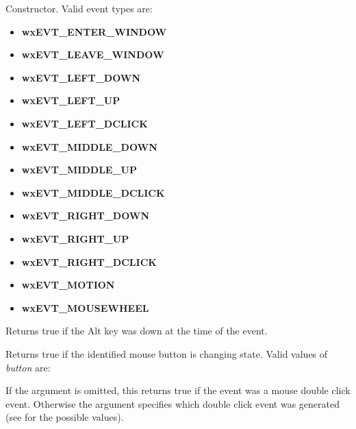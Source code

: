 Constructor. Valid event types are:

\begin{itemize}
\itemsep=0pt
\item {\bf wxEVT\_ENTER\_WINDOW}
\item {\bf wxEVT\_LEAVE\_WINDOW}
\item {\bf wxEVT\_LEFT\_DOWN}
\item {\bf wxEVT\_LEFT\_UP}
\item {\bf wxEVT\_LEFT\_DCLICK}
\item {\bf wxEVT\_MIDDLE\_DOWN}
\item {\bf wxEVT\_MIDDLE\_UP}
\item {\bf wxEVT\_MIDDLE\_DCLICK}
\item {\bf wxEVT\_RIGHT\_DOWN}
\item {\bf wxEVT\_RIGHT\_UP}
\item {\bf wxEVT\_RIGHT\_DCLICK}
\item {\bf wxEVT\_MOTION}
\item {\bf wxEVT\_MOUSEWHEEL}
\end{itemize}


\label{wxmouseeventaltdown}


Returns true if the Alt key was down at the time of the event.


\label{wxmouseeventbutton}


Returns true if the identified mouse button is changing state. Valid
values of {\it button} are:

\begin{twocollist}\itemsep=0pt
\end{twocollist}


\label{wxmouseeventbuttondclick}


If the argument is omitted, this returns true if the event was a mouse
double click event. Otherwise the argument specifies which double click event
was generated (see  for the possible
values).


